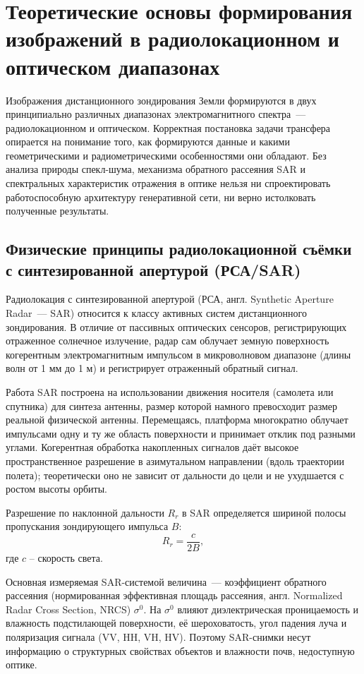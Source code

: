 \chapter{Теоретические основы формирования изображений в радиолокационном и оптическом диапазонах}
\label{sec:Chapter1} 

Изображения дистанционного зондирования Земли формируются в двух принципиально различных диапазонах электромагнитного спектра~--- радиолокационном и оптическом.
Корректная постановка задачи трансфера опирается на понимание того, как формируются данные и какими геометрическими и радиометрическими особенностями они обладают.
Без анализа природы спекл-шума, механизма обратного рассеяния SAR и спектральных характеристик отражения в оптике нельзя ни спроектировать работоспособную архитектуру генеративной сети, ни верно истолковать полученные результаты.

\section{Физические принципы радиолокационной съёмки с синтезированной апертурой (РСА/SAR)}
Радиолокация с синтезированной апертурой (РСА, англ. Synthetic Aperture Radar~--- SAR) относится к классу активных систем дистанционного зондирования.
В отличие от пассивных оптических сенсоров, регистрирующих отраженное солнечное излучение, радар сам облучает земную поверхность когерентным электромагнитным импульсом в микроволновом диапазоне (длины волн от 1 мм до 1 м) и регистрирует отраженный обратный сигнал.

Работа SAR построена на использовании движения носителя (самолета или спутника) для синтеза антенны, размер которой намного превосходит размер реальной физической антенны.
Перемещаясь, платформа многократно облучает импульсами одну и ту же область поверхности и принимает отклик под разными углами.
Когерентная обработка накопленных сигналов даёт высокое пространственное разрешение в азимутальном направлении (вдоль траектории полета); теоретически оно не зависит от дальности до цели и не ухудшается с ростом высоты орбиты.

Разрешение по наклонной дальности $R_r$ в SAR определяется шириной полосы пропускания зондирующего импульса $B$:
$$
R_r=\frac{c}{2B},
$$
где $c$ -- скорость света.

Основная измеряемая SAR-системой величина~--- коэффициент обратного рассеяния (нормированная эффективная площадь рассеяния, англ. Normalized Radar Cross Section, NRCS) $\sigma^0$.
На $\sigma^0$ влияют диэлектрическая проницаемость и влажность подстилающей поверхности, её шероховатость, угол падения луча и поляризация сигнала (VV, HH, VH, HV).
Поэтому SAR-снимки несут информацию о структурных свойствах объектов и влажности почв, недоступную оптике.

